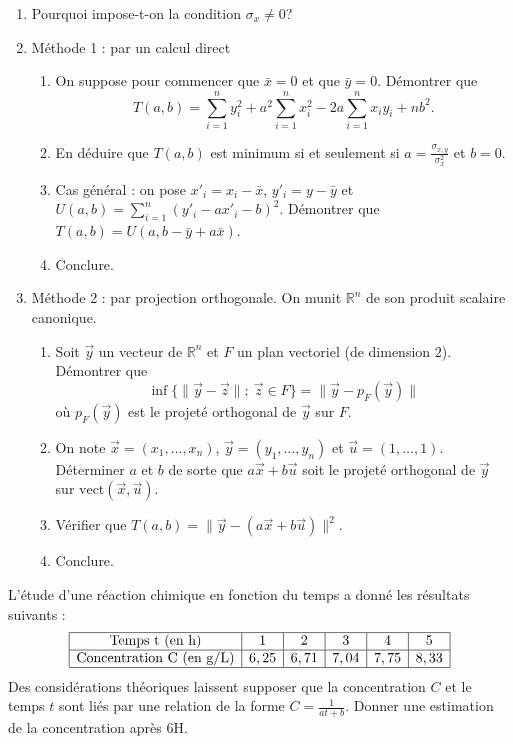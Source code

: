 \documentclass[../PolyS4.tex]{subfiles}
\begin{document}
\begin{enumerate}
\item Pourquoi impose-t-on la condition $\sigma_x\neq 0$?
\item Méthode 1 : par un calcul direct
\begin{enumerate}
\item On suppose pour commencer que $\bar x=0$ et que $\bar y=0$. Démontrer que 
$$T(a,b)=\sum_{i=1}^n y_i^2+a^2\sum_{i=1}^n x_i^2-2a\sum_{i=1}^n x_iy_i+nb^2.$$
\item En déduire que $T(a,b)$ est minimum si et seulement si $a=\frac{\sigma_{x,y}}{\sigma_x^2}$ et $b=0$.
\item Cas général : on pose $x'_i=x_i-\bar x$, $y'_i=y-\bar y$ et $U(a,b)=\sum_{i=1}^n (y'_i-ax'_i-b)^2$. Démontrer que $T(a,b)=U(a,b-\bar y+a\bar x)$. 
\item Conclure.
\end{enumerate}
\item Méthode 2 : par projection orthogonale. On munit $\mathbb R^n$ de son produit scalaire canonique.
\begin{enumerate}
\item Soit $\vec y$ un vecteur de $\mathbb R^n$ et $F$ un plan vectoriel (de dimension $2$). Démontrer que 
$$\inf \{\|\vec y-\vec z\|;\ \vec z\in F\}=\|\vec y-p_F(\vec y)\|$$
où $p_F(\vec y)$ est le projeté orthogonal de $\vec y$ sur $F$.
\item On note $\vec x=(x_1,\dots,x_n)$, $\vec y=(y_1,\dots,y_n)$ et $\vec u=(1,\dots,1)$. Déterminer $a$ et $b$ de sorte
que $a\vec x+b\vec u$ soit le projeté orthogonal de $\vec y$ sur $\textrm{vect}(\vec x,\vec u)$.
\item Vérifier que $T(a,b)=\|\vec y-(a\vec x+b\vec u)\|^2$.
\item Conclure.
\end{enumerate}
\end{enumerate}

\newpage


L'étude d'une réaction chimique en fonction du temps a donné les résultats suivants : 
$$\begin{array}{|c|c|c|c|c|c|}
\hline
\textrm{Temps t (en h)}&1&2&3&4&5\\ \hline
\textrm{Concentration C (en g/L)}&6,25&6,71&7,04&7,75&8,33\\
\hline
\end{array}
$$
Des considérations théoriques laissent supposer que la concentration $C$ et le temps $t$ sont liés par une relation de la forme $C=\frac 1{at+b}$. Donner une estimation de la concentration après 6H.
\end{document}
